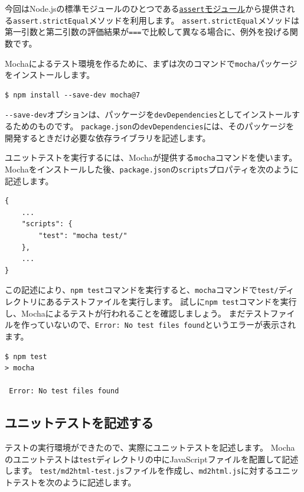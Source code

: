 今回はNode.jsの標準モジュールのひとつである\href{https://nodejs.org/api/assert.html}{\texttt{assert}モジュール}から提供される\texttt{assert.strictEqual}メソッドを利用します。
\texttt{assert.strictEqual}メソッドは第一引数と第二引数の評価結果が\texttt{===}で比較して異なる場合に、例外を投げる関数です。

Mochaによるテスト環境を作るために、まずは次のコマンドで\texttt{mocha}パッケージをインストールします。

\begin{lstlisting}
$ npm install --save-dev mocha@7
\end{lstlisting}

\texttt{-\/-save-dev}オプションは、パッケージを\texttt{devDependencies}としてインストールするためのものです。
\texttt{package.json}の\texttt{devDependencies}には、そのパッケージを開発するときだけ必要な依存ライブラリを記述します。

ユニットテストを実行するには、Mochaが提供する\texttt{mocha}コマンドを使います。
Mochaをインストールした後、\texttt{package.json}の\texttt{scripts}プロパティを次のように記述します。

\begin{lstlisting}
{
    ...
    "scripts": {
        "test": "mocha test/"
    },
    ...
}
\end{lstlisting}

この記述により、\texttt{npm test}コマンドを実行すると、\texttt{mocha}コマンドで\texttt{test/}ディレクトリにあるテストファイルを実行します。
試しに\texttt{npm test}コマンドを実行し、Mochaによるテストが行われることを確認しましょう。
まだテストファイルを作っていないので、\texttt{Error: No test files found}というエラーが表示されます。

\begin{lstlisting}
$ npm test
> mocha

 Error: No test files found
\end{lstlisting}

\hypertarget{write-unit-test}{%
\subsection{ユニットテストを記述する}\label{write-unit-test}}

テストの実行環境ができたので、実際にユニットテストを記述します。
Mochaのユニットテストは\texttt{test}ディレクトリの中にJavaScriptファイルを配置して記述します。
\texttt{test/md2html-test.js}ファイルを作成し、\texttt{md2html.js}に対するユニットテストを次のように記述します。

